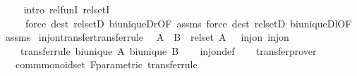 \begin{isabellebody}
%
\isadelimproof
\ \ %
\endisadelimproof
%
\isatagproof
{}\isamarkupfalse%
\ {\isacharparenleft}{\kern0pt}intro\ rel{\isacharunderscore}{\kern0pt}funI\ rel{\isacharunderscore}{\kern0pt}setI{\isacharparenright}{\kern0pt}\isanewline
\ \ \ \ {\isacharparenleft}{\kern0pt}force\ dest{\isacharcolon}{\kern0pt}\ rel{\isacharunderscore}{\kern0pt}setD{}\ bi{\isacharunderscore}{\kern0pt}uniqueDr{\isacharbrackleft}{\kern0pt}OF\ assms{\isacharbrackright}{\kern0pt}{\isacharcomma}{\kern0pt}\ force\ dest{\isacharcolon}{\kern0pt}\ rel{\isacharunderscore}{\kern0pt}setD{}\ bi{\isacharunderscore}{\kern0pt}uniqueDl{\isacharbrackleft}{\kern0pt}OF\ assms{\isacharbrackright}{\kern0pt}{\isacharparenright}{\kern0pt}%
\endisatagproof
{\isafoldproof}%
%
\isadelimproof
\isanewline
%
\endisadelimproof
\isanewline
{}\isamarkupfalse%
\ inj{\isacharunderscore}{\kern0pt}on{\isacharunderscore}{\kern0pt}transfer{\isacharbrackleft}{\kern0pt}transfer{\isacharunderscore}{\kern0pt}rule{\isacharbrackright}{\kern0pt}{\isacharcolon}{\kern0pt}\isanewline
\ \ {\isachardoublequoteopen}{\isacharparenleft}{\kern0pt}{\isacharparenleft}{\kern0pt}A\ {\isacharequal}{\kern0pt}{\isacharequal}{\kern0pt}{\isacharequal}{\kern0pt}{\isachargreater}{\kern0pt}\ B{\isacharparenright}{\kern0pt}\ {\isacharequal}{\kern0pt}{\isacharequal}{\kern0pt}{\isacharequal}{\kern0pt}{\isachargreater}{\kern0pt}\ rel{\isacharunderscore}{\kern0pt}set\ A\ {\isacharequal}{\kern0pt}{\isacharequal}{\kern0pt}{\isacharequal}{\kern0pt}{\isachargreater}{\kern0pt}\ {\isacharparenleft}{\kern0pt}{\isacharequal}{\kern0pt}{\isacharparenright}{\kern0pt}{\isacharparenright}{\kern0pt}\ inj{\isacharunderscore}{\kern0pt}on\ inj{\isacharunderscore}{\kern0pt}on{\isachardoublequoteclose}\isanewline
\ \ \ {\isacharbrackleft}{\kern0pt}transfer{\isacharunderscore}{\kern0pt}rule{\isacharbrackright}{\kern0pt}{\isacharcolon}{\kern0pt}\ {\isachardoublequoteopen}bi{\isacharunderscore}{\kern0pt}unique\ A{\isachardoublequoteclose}\ {\isachardoublequoteopen}bi{\isacharunderscore}{\kern0pt}unique\ B{\isachardoublequoteclose}\isanewline
%
\isadelimproof
\ \ %
\endisadelimproof
%
\isatagproof
{}\isamarkupfalse%
\ inj{\isacharunderscore}{\kern0pt}on{\isacharunderscore}{\kern0pt}def\isanewline
\ \ \isamarkupfalse%
\ transfer{\isacharunderscore}{\kern0pt}prover%
\endisatagproof
{\isafoldproof}%
%
\isadelimproof
\isanewline
%
\endisadelimproof
\isanewline
{}\isamarkupfalse%
\isanewline
\isanewline
{}\isamarkupfalse%
\ {\isacharparenleft}{\kern0pt}\ comm{\isacharunderscore}{\kern0pt}monoid{\isacharunderscore}{\kern0pt}set{\isacharparenright}{\kern0pt}\ F{\isacharunderscore}{\kern0pt}parametric\ {\isacharbrackleft}{\kern0pt}transfer{\isacharunderscore}{\kern0pt}rule{\isacharbrackright}{\kern0pt}{\isacharcolon}{\kern0pt}\isanewline

\end{isabellebody}
